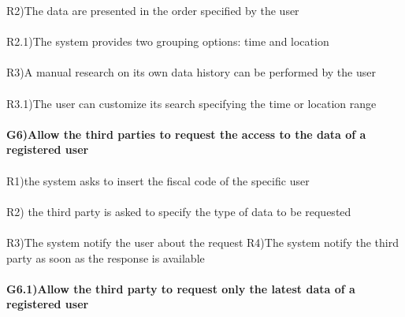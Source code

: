 R2)The data are presented in the order specified by the user  \\ \\
R2.1)The system provides two grouping options: time and location \\ \\
R3)A manual research on its own data history can be performed by the user \\ \\
R3.1)The user can customize its search specifying the time or location range \\ \\ 
\textbf{G6)Allow the third parties to request the access to the data of a registered user} \\ \\
R1)the system asks to insert the fiscal code of the specific user \\ \\
R2) the third party is asked to specify the type of data to be requested\\ \\ 
R3)The system notify the user about the request 
R4)The system notify the third party as soon as the response is available \\ \\
\textbf{G6.1)Allow the third party to request only the latest data of a registered user} \\ \\

